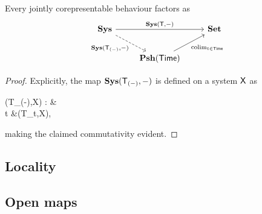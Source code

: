 
\begin{proposition}
	Every jointly corepresentable behaviour factors as
	\begin{equation}
		\begin{tikzcd}[ampersand replacement=\&]
			\Sys \&\& \Set \\
			\& {\Psh(\Time)}
			\arrow["{\Sys(\sys T,-)}", from=1-1, to=1-3]
			\arrow["{\Sys(\sys T_{(-)},-)}"', dashed, from=1-1, to=2-2]
			\arrow["\colim_{t \in \Time}"', from=2-2, to=1-3]
		\end{tikzcd}
	\end{equation}
\end{proposition}
\begin{proof}
	Explicitly, the map ${\mathbf{Sys}}(\mathsf{T}_{(-)},-)$ is defined on a system $\mathsf{X}$ as
	\begin{eqalign}
		\Sys(\sys T_{(-)},\sys X) : \Time &\longto \Set\\
		t &\mapsto \Sys(\sys T_t,\sys X),
	\end{eqalign}
	making the claimed commutativity evident.
\end{proof}

\subsection{Locality}

\subsection{Open maps}
